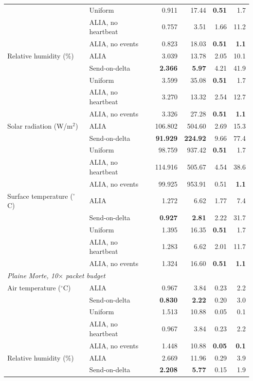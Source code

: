 \begin{tabular}{llrrrr}
 & Uniform & 0.911 & 17.44 & \textbf{0.51} & 1.7 \\
 & ALIA, no heartbeat & 0.757 & 3.51 & 1.66 & 11.2 \\
 & ALIA, no events & 0.823 & 18.03 & \textbf{0.51} & \textbf{1.1} \\
Relative humidity (\%) & ALIA & 3.039 & 13.78 & 2.05 & 10.1 \\
 & Send-on-delta & \textbf{2.366} & \textbf{5.97} & 4.21 & 41.9 \\
 & Uniform & 3.599 & 35.08 & \textbf{0.51} & 1.7 \\
 & ALIA, no heartbeat & 3.270 & 13.32 & 2.54 & 12.7 \\
 & ALIA, no events & 3.326 & 27.28 & \textbf{0.51} & \textbf{1.1} \\
Solar radiation (W/m$^2$) & ALIA & 106.802 & 504.60 & 2.69 & 15.3 \\
 & Send-on-delta & \textbf{91.929} & \textbf{224.92} & 9.66 & 77.4 \\
 & Uniform & 98.759 & 937.42 & \textbf{0.51} & 1.7 \\
 & ALIA, no heartbeat & 114.916 & 505.67 & 4.54 & 38.6 \\
 & ALIA, no events & 99.925 & 953.91 & 0.51 & \textbf{1.1} \\
Surface temperature ($^\circ$C) & ALIA & 1.272 & 6.62 & 1.77 & 7.4 \\
 & Send-on-delta & \textbf{0.927} & \textbf{2.81} & 2.22 & 31.7 \\
 & Uniform & 1.395 & 16.35 & \textbf{0.51} & 1.7 \\
 & ALIA, no heartbeat & 1.283 & 6.62 & 2.01 & 11.7 \\
 & ALIA, no events & 1.324 & 16.60 & \textbf{0.51} & \textbf{1.1} \\
\midrule
\multicolumn{6}{l}{\emph{Plaine Morte, 10$\times$ packet budget}} \\
Air temperature ($^\circ$C) & ALIA & 0.967 & 3.84 & 0.23 & 2.2 \\
 & Send-on-delta & \textbf{0.830} & \textbf{2.22} & 0.20 & 3.0 \\
 & Uniform & 1.513 & 10.88 & 0.05 & 0.1 \\
 & ALIA, no heartbeat & 0.967 & 3.84 & 0.23 & 2.2 \\
 & ALIA, no events & 1.448 & 10.88 & \textbf{0.05} & \textbf{0.1} \\
Relative humidity (\%) & ALIA & 2.669 & 11.96 & 0.29 & 3.9 \\
 & Send-on-delta & \textbf{2.208} & \textbf{5.77} & 0.15 & 1.9 \\

\end{tabular}
